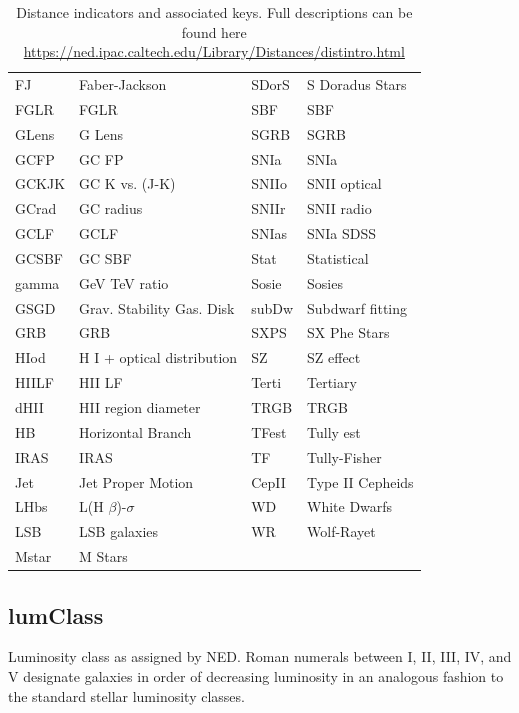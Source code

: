 \documentclass[iop]{emulateapj-rtx4}
\begin{document}
\begin{table}[ht]
\begin{center}
\begin{tabular}{l l | l l}
    FJ		&	Faber-Jackson			&	SDorS    	&	S Doradus Stars    	\\
    FGLR	&	FGLR				&	SBF    	&	SBF    	\\
    GLens	&	G Lens				&	SGRB    	&	SGRB    	\\
    GCFP	&	GC FP				&	SNIa    	&	SNIa    	\\
    GCKJK	&	GC K vs. (J-K)			&	SNIIo    	&	SNII optical    	\\
    GCrad	&	GC radius				&	SNIIr    	&	SNII radio    	\\
    GCLF	&	GCLF				&	SNIas    	&	SNIa SDSS    	\\
    GCSBF	&	GC SBF				&	Stat    	&	Statistical    	\\
    gamma	&	GeV TeV ratio			&	Sosie    	&	Sosies    	\\
    GSGD	&	Grav. Stability Gas. Disk 	&	subDw    	&	Subdwarf fitting    	\\
    GRB	&	GRB					&	SXPS	&	SX Phe Stars    	\\
    HIod	&	H I + optical distribution	&	SZ    	&	SZ effect    	\\
    HIILF	&	HII LF				&	Terti		&	Tertiary    	\\
    dHII	&	HII region diameter		&	TRGB    	&	TRGB    	\\
    HB	&	Horizontal Branch    		&	TFest    	&	Tully est    	\\
    IRAS	&	IRAS    				&	TF		&	Tully-Fisher    	\\
    Jet	&	Jet Proper Motion    		&	CepII    	&	Type II Cepheids    	\\
    LHbs	&	L(H $\beta$)-$\sigma$	&	WD    	&	White Dwarfs    	\\
    LSB	&	LSB galaxies			&	WR    	&	Wolf-Rayet    	\\
    Mstar	&	M Stars				&			&					\\

\hline
\end{tabular}
\end{center}
  \caption{\small{Distance indicators and associated keys. Full descriptions can be found here \url{https://ned.ipac.caltech.edu/Library/Distances/distintro.html}}}
  \label{distIndicators}
\end{table}


\subsection{lumClass}
Luminosity class as assigned by NED. Roman numerals between I, II, III, IV, and V designate galaxies in order of decreasing luminosity in an analogous fashion to the standard stellar luminosity classes.
\end{document}
